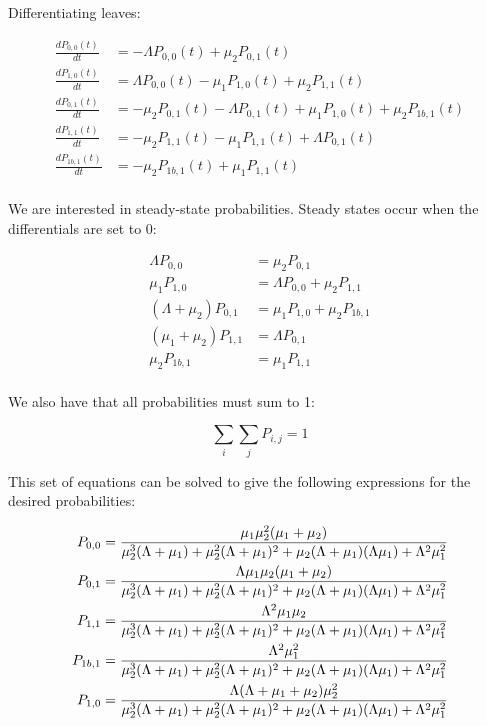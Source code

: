 \documentclass{article}
\begin{document}
Differentiating leaves:

\begin{align*}
    \frac{d P_{0,0}(t)}{dt} &= - \Lambda P_{0,0}(t) + \mu_2 P_{0,1}(t)\\
    \frac{d P_{1,0}(t)}{dt} &= \Lambda P_{0,0}(t) - \mu_1 P_{1,0}(t) + \mu_2 P_{1,1}(t)\\
    \frac{d P_{0,1}(t)}{dt} &= - \mu_2 P_{0,1}(t) - \Lambda P_{0,1}(t) + \mu_1 P_{1,0}(t) + \mu_2 P_{1b,1}(t)\\
    \frac{d P_{1,1}(t)}{dt} &= - \mu_2 P_{1,1}(t) - \mu_1 P_{1,1}(t) + \Lambda P_{0,1}(t)\\
    \frac{d P_{1b,1}(t)}{dt} &= - \mu_2 P_{1b,1}(t) + \mu_1 P_{1,1}(t)\\
\end{align*}

We are interested in steady-state probabilities. Steady states occur when the differentials are set to 0:

\begin{align*}
    \Lambda P_{0,0} &= \mu_2 P_{0,1}\\
    \mu_1 P_{1,0} &= \Lambda P_{0,0} + \mu_2 P_{1,1}\\
    (\Lambda + \mu_2) P_{0,1} &= \mu_1 P_{1,0} + \mu_2 P_{1b,1}\\
    (\mu_1 + \mu_2) P_{1,1} &= \Lambda P_{0,1}\\
    \mu_2 P_{1b,1} &= \mu_1 P_{1,1}\\
\end{align*}

We also have that all probabilities must sum to 1:

\begin{equation*}
    \sum_i \sum_j P_{i,j} = 1
\end{equation*}

This set of equations can be solved to give the following expressions for the desired probabilities:

\begin{align*}
    P_{0,0} &= {{\mu_1\mu_2^2(\mu_1+\mu_2)}\over{\mu_2^3(\Lambda+\mu_1) + \mu_2^2(\Lambda+\mu_1)^2 + \mu_2(\Lambda+\mu_1)(\Lambda\mu_1) + \Lambda^2\mu_1^2}}\\
    P_{0,1} &= {{\Lambda\mu_1\mu_2(\mu_1+\mu_2)}\over{\mu_2^3(\Lambda+\mu_1) + \mu_2^2(\Lambda+\mu_1)^2 + \mu_2(\Lambda+\mu_1)(\Lambda\mu_1) + \Lambda^2\mu_1^2}}\\
    P_{1,1} &= {{\Lambda^2\mu_1\mu_2}\over{\mu_2^3(\Lambda+\mu_1) + \mu_2^2(\Lambda+\mu_1)^2 + \mu_2(\Lambda+\mu_1)(\Lambda\mu_1) + \Lambda^2\mu_1^2}}\\
    P_{1b,1} &= {{\Lambda^2\mu_1^2}\over{\mu_2^3(\Lambda+\mu_1) + \mu_2^2(\Lambda+\mu_1)^2 + \mu_2(\Lambda+\mu_1)(\Lambda\mu_1) + \Lambda^2\mu_1^2}}\\
    P_{1,0} &= {{\Lambda(\Lambda+\mu_1+\mu_2)\mu_2^2}\over{\mu_2^3(\Lambda+\mu_1) + \mu_2^2(\Lambda+\mu_1)^2 + \mu_2(\Lambda+\mu_1)(\Lambda\mu_1) + \Lambda^2\mu_1^2}}\\
\end{align*}
\end{document}
